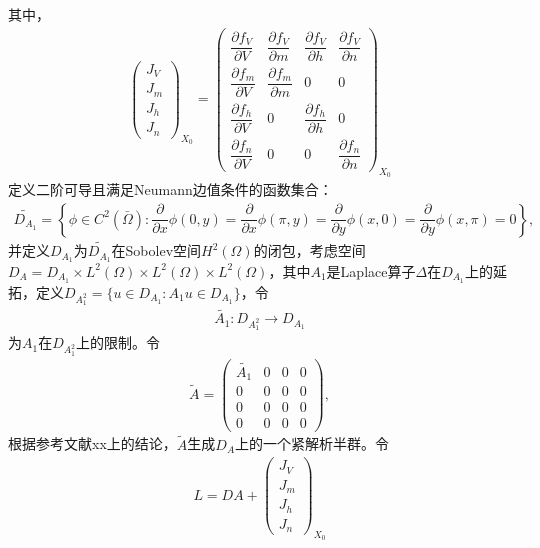 \documentclass[
    bachelor,
    nofont, %
    pdflinks,
    ]{xjtuthesis}
\begin{document}
其中，
\begin{align}
\left(
\begin{array}{c}
J_V\\
J_m\\
J_h\\
J_n
\end{array}
\right)_{X_0}=
\left(                
  \begin{array}{cccc}   
    \dfrac{\partial f_V}{\partial V} & \dfrac{\partial f_V}{\partial m} & \dfrac{\partial f_V}{\partial h} & \dfrac{\partial f_V}{\partial n}\\  
    \dfrac{\partial f_m}{\partial V} & \dfrac{\partial f_m}{\partial m} & 0 & 0\\   
    \dfrac{\partial f_h}{\partial V} & 0  & \dfrac{\partial f_h}{\partial h} & 0 \\
    \dfrac{\partial f_n}{\partial V} & 0 & 0 & \dfrac{\partial f_n}{\partial n} 
  \end{array}
\right)_{X_0}
\end{align}
定义二阶可导且满足Neumann边值条件的函数集合：
\begin{align*}
\widetilde{D_{A_1}} =\left\{\phi\in C^2(\bar{\Omega}):\dfrac{\partial}{\partial x}\phi(0,y)=\dfrac{\partial}{\partial x}\phi(\pi,y)=\dfrac{\partial}{\partial y}\phi(x,0)=\dfrac{\partial}{\partial y}\phi(x,\pi)=0\right\},
\end{align*}
并定义$D_{A_1}$为$\widetilde{D_{A_1}}$在Sobolev空间$H^2(\Omega)$的闭包，考虑空间$D_A=D_{A_1}\times L^2(\Omega) \times L^2(\Omega) \times L^2(\Omega)$，其中$A_1$是Laplace算子$\Delta$在$D_{A_1}$上的延拓，定义$D_{A_1^2}=\{u \in D_{A_1}:A _1 u\in D_{A_1}\}$，令
\begin{align*}
\tilde{A_1}:D_{A_1^2} \rightarrow D_{A_1}
\end{align*}
为$A_1$在$D_{A_1^2}$上的限制。令
\begin{align*}
\tilde{A}=\left(
\begin{array}{cccc}
\tilde{A_1} &0 & 0 &0\\
0&0 & 0 &0\\
0 &0 & 0 &0\\
0 &0 & 0 &0
\end{array}
\right),
\end{align*}
根据参考文献xx上的结论，$\tilde{A}$生成$D_A$上的一个紧解析半群。令
\begin{align*}
L=DA+\left(
\begin{array}{c}
J_V\\
J_m\\
J_h\\
J_n
\end{array}
\right)_{X_0}
\end{align*}
\end{document}
